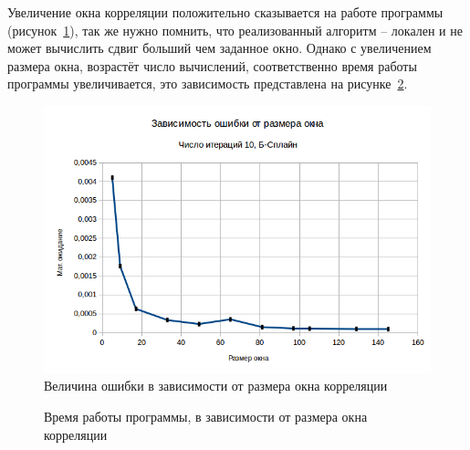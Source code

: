 Увеличение окна корреляции положительно сказывается на работе программы (рисунок~\ref{fig:window_error}), так же нужно помнить, что реализованный алгоритм -- локален и не может вычислить сдвиг больший чем заданное окно. Однако с увеличением размера окна, возрастёт число вычислений, соответственно время работы программы увеличивается, это зависимость представлена на рисунке~\ref{pic:window_time}.
\begin{figure}
\centering
\includegraphics[width=0.9\linewidth]{images/window_error}
\caption{Величина ошибки в зависимости от размера окна корреляции}
\label{fig:window_error}
\end{figure}

\begin{figure}[h!]
\caption{Время работы программы, в зависимости от размера окна корреляции}
\label{pic:window_time}
\end{figure}